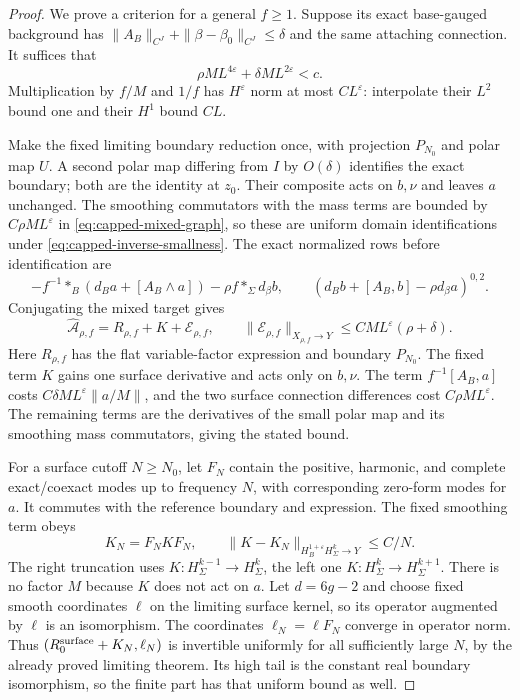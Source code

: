 \documentclass[11pt]{amsart}
\theoremstyle{definition}
\theoremstyle{remark}
\theoremstyle{plain}
\begin{document}
\begin{proof}
We prove a criterion for a general $f\geq1$. Suppose its exact
base-gauged background has
$\|A_B\|_{C^J}+\|\beta-\beta_0\|_{C^J}\leq\delta$ and the
same attaching connection. It suffices that
\begin{equation}\label{eq:capped-inverse-smallness}
 \rho ML^{4\varepsilon}+\delta ML^{2\varepsilon}<c.
\end{equation}
Multiplication by $f/M$ and $1/f$ has $H^\varepsilon$ norm at
most $CL^\varepsilon$: interpolate their $L^2$ bound one and
their $H^1$ bound $CL$.

Make the fixed limiting boundary reduction once, with projection
$P_{N_0}$ and polar map $U$. A second polar map differing from
$I$ by $O(\delta)$ identifies the exact boundary; both are the
identity at $z_0$. Their composite acts on $b,\nu$ and leaves
$a$ unchanged. The smoothing commutators with the mass terms
are bounded by $C\rho ML^\varepsilon$ in
\eqref{eq:capped-mixed-graph}, so these are uniform domain
identifications under \eqref{eq:capped-inverse-smallness}.
The exact normalized rows before identification are
\[
 -f^{-1}*_B(d_Ba+[A_B\wedge a])-\rho f *_\Sigma d_\beta b,
 \qquad(d_Bb+[A_B,b]-\rho d_\beta a)^{0,2}.
\]
Conjugating the mixed target gives
\begin{equation}\label{eq:capped-operator-decomposition}
 \widehat{\mathcal A}_{\rho,f}=R_{\rho,f}+K+\mathcal E_{\rho,f},
 \qquad\|\mathcal E_{\rho,f}\|_{X_{\rho,f}\to Y}
                         \leq CML^\varepsilon(\rho+\delta).
\end{equation}
Here $R_{\rho,f}$ has the flat variable-factor expression and
boundary $P_{N_0}$. The fixed term $K$ gains one surface derivative
and acts only on $b,\nu$. The term $f^{-1}[A_B,a]$ costs
$C\delta ML^\varepsilon\|a/M\|$, and the two surface connection
differences cost $C\rho ML^\varepsilon$. The remaining terms
are the derivatives of the small polar map and its smoothing
mass commutators, giving the stated bound.

For a surface cutoff $N\geq N_0$, let $F_N$ contain the positive,
harmonic, and complete exact/coexact modes up to frequency $N$,
with corresponding zero-form modes for $a$. It commutes with the
reference boundary and expression. The fixed smoothing term obeys
\[
 K_N=F_NKF_N,\qquad
 \|K-K_N\|_{H_B^{1+\varepsilon}H_\Sigma^k\to Y}\leq C/N.
\]
The right truncation uses $K:H^{k-1}_\Sigma\to H^k_\Sigma$,
the left one $K:H^k_\Sigma\to H^{k+1}_\Sigma$.
There is no factor $M$ because $K$ does not act on $a$.
Let $d=6g-2$ and choose fixed smooth coordinates $\ell$ on
the limiting surface kernel, so its operator augmented by $\ell$
is an isomorphism. The coordinates $\ell_N=\ell F_N$ converge
in operator norm. Thus $(R_0^{\rm surface}+K_N,\ell_N)$ is
invertible uniformly for all sufficiently large $N$, by the
already proved limiting theorem. Its high tail is the constant
real boundary isomorphism, so the finite part has that uniform
bound as well.


\end{proof}
\end{document}

